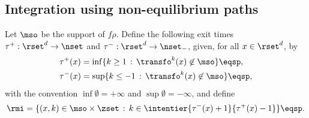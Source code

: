 \subsection{Integration using non-equilibrium paths} \label{sec:estimator}
   
Let $\mso$ be the support of $f\rho$. %
Define the following exit times
$\tau^{+} : \rset^d \to \nset$ and $\tau^{-} : \rset^d \to \nset_-$, given, for
all $x \in \rset^d$, by
\begin{align}
\label{eq:definition-tau-+--}
&\tau^{+}(x)=\inf\{k\geq 1\, :  \,  \transfo^{k}(x) \not \in \mso\} \eqsp, \\
&\tau^{-}(x)=\sup\{k\leq -1\, :  \,  \transfo^{k}(x) \not \in \mso\} \eqsp,
\end{align}
with the convention $\inf \emptyset = +\infty$ and
$\sup \emptyset = - \infty$, and define
\begin{equation}
  \label{eq:def_rmi}
  \rmi = \{(x,k) \in \mso\times \zset\,:\, k \in
\intentier{\tau^-(x)+1}{\tau^+(x)-1}\} \eqsp.
\end{equation}

